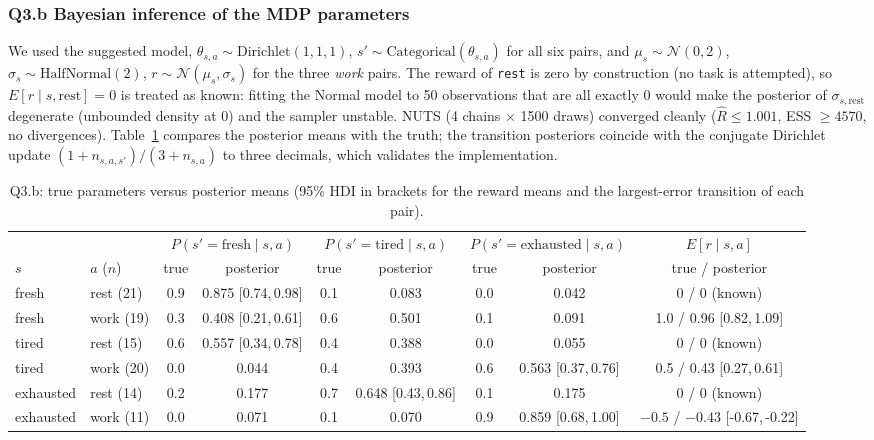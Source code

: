 \documentclass[10pt,a4paper]{article}
\newcommand{\Rhat}{\widehat{R}}
\newcommand{\HDI}[2]{[#1,\,#2]}
\newcommand{\code}[1]{\texttt{#1}}
\begin{document}
\subsubsection{Q3.b Bayesian inference of the MDP parameters} We used the suggested model, $\theta_{s,a}\sim\text{Dirichlet}(1,1,1)$, $s'\sim\text{Categorical}(\theta_{s,a})$ for all six pairs, and $\mu_{s}\sim\mathcal N(0,2)$, $\sigma_{s}\sim\text{HalfNormal}(2)$, $r\sim\mathcal N(\mu_s,\sigma_s)$ for the three \emph{work} pairs. The reward of \code{rest} is zero by construction (no task is attempted), so $E[r\mid s,\text{rest}]=0$ is treated as known: fitting the Normal model to 50 observations that are all exactly 0 would make the posterior of $\sigma_{s,\text{rest}}$ degenerate (unbounded density at 0) and the sampler unstable. NUTS (4 chains $\times$ 1500 draws) converged cleanly ($\Rhat\le1.001$, ESS $\ge4570$, no divergences). Table~\ref{tab:q3} compares the posterior means with the truth; the transition posteriors coincide with the conjugate Dirichlet update $(1+n_{s,a,s'})/(3+n_{s,a})$ to three decimals, which validates the implementation.

\begin{table}[t]
\centering\footnotesize
\caption{Q3.b: true parameters versus posterior means (95\% HDI in brackets for the reward means and the largest-error transition of each pair).}
\label{tab:q3}
\setlength{\tabcolsep}{3pt}
\begin{tabular}{ll cc cc cc c}
\toprule
 & & \multicolumn{2}{c}{$P(s'{=}\text{fresh}\mid s,a)$} & \multicolumn{2}{c}{$P(s'{=}\text{tired}\mid s,a)$} & \multicolumn{2}{c}{$P(s'{=}\text{exhausted}\mid s,a)$} & $E[r\mid s,a]$\\
$s$ & $a$ ($n$) & true & posterior & true & posterior & true & posterior & true / posterior\\
\midrule
fresh & rest (21) & 0.9 & 0.875 \HDI{0.74}{0.98} & 0.1 & 0.083 & 0.0 & 0.042 & 0 / 0 (known)\\
fresh & work (19) & 0.3 & 0.408 \HDI{0.21}{0.61} & 0.6 & 0.501 & 0.1 & 0.091 & 1.0 / 0.96 \HDI{0.82}{1.09}\\
tired & rest (15) & 0.6 & 0.557 \HDI{0.34}{0.78} & 0.4 & 0.388 & 0.0 & 0.055 & 0 / 0 (known)\\
tired & work (20) & 0.0 & 0.044 & 0.4 & 0.393 & 0.6 & 0.563 \HDI{0.37}{0.76} & 0.5 / 0.43 \HDI{0.27}{0.61}\\
exhausted & rest (14) & 0.2 & 0.177 & 0.7 & 0.648 \HDI{0.43}{0.86} & 0.1 & 0.175 & 0 / 0 (known)\\
exhausted & work (11) & 0.0 & 0.071 & 0.1 & 0.070 & 0.9 & 0.859 \HDI{0.68}{1.00} & $-0.5$ / $-0.43$ \HDI{-0.67}{-0.22}\\
\bottomrule
\end{tabular}
\end{table}
\end{document}
